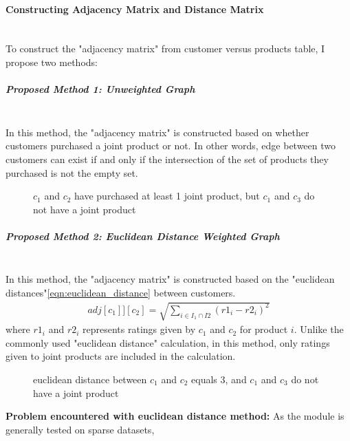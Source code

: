 \documentclass[12pt]{article}
\begin{document}
	\paragraph{Constructing Adjacency Matrix and Distance Matrix}\mbox{}\\
	To construct the "adjacency matrix" from customer versus products table, I propose two methods:
	\subparagraph{Proposed Method 1: Unweighted Graph}\mbox{}\\
	In this method, the "adjacency matrix" is constructed based on whether customers purchased a joint product or not. In other words, edge between two customers can exist if and only if the intersection of the set of products they purchased is not the empty set.
	\begin{figure}[H]
		\centering
		\caption{$c_{1}$ and $c_{2}$ have purchased at least 1 joint product, but $c_{1}$ and $c_{3}$ do not have a joint product}
	\end{figure}
	
	\subparagraph{Proposed Method 2: Euclidean Distance Weighted Graph}\mbox{}\\
	In this method, the "adjacency matrix" is constructed based on the "euclidean distances"\ref{eqn:euclidean_distance} between customers. 
	\begin{equation} 
	\label{eqn:euclidean_distance}
	\begin{split}
	adj[c_{1}]][c_{2}] = \sqrt{\sum_{i\in I_{1}\cap I{2}}^{} (r1_{i}-r2_{i})^2}
	\end{split}
	\end{equation}
	where $r1_{i}$ and $r2_{i}$ represents ratings given by $c_{1}$ and $c_{2}$ for product $i$. Unlike the commonly used "euclidean distance" calculation, in this method, only ratings given to joint products are included in the calculation.
	\begin{figure}[H]
		\centering
		\caption{euclidean distance between $c_{1}$ and $c_{2}$ equals 3, and $c_{1}$ and $c_{3}$ do not have a joint product}
	\end{figure}
	\textbf{Problem encountered with euclidean distance method:} As the module is generally tested on sparse datasets, 
	
\end{document}
